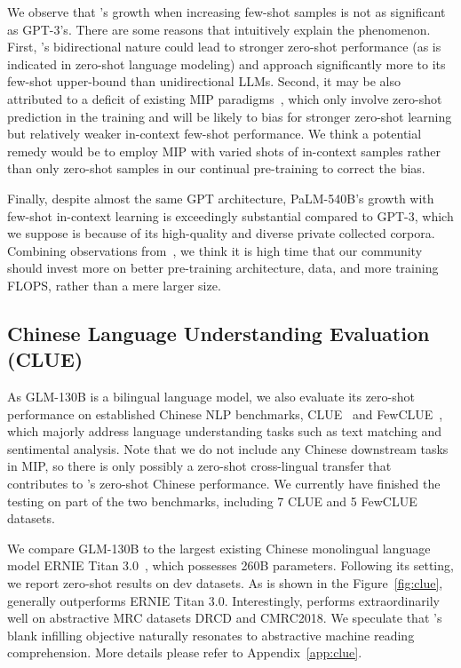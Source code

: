 {
We observe that \glm's growth when increasing few-shot samples is not as significant as GPT-3's. 
There are some reasons that intuitively explain the phenomenon.
First, \glm's bidirectional nature could lead to stronger zero-shot performance (as is indicated in zero-shot language modeling) and approach significantly more to its few-shot upper-bound than unidirectional LLMs.
Second, it may be also attributed to a deficit of existing MIP paradigms~\citep{wei2022finetuned,sanh2022multitask}, which only involve zero-shot prediction in the training and will be likely to bias \glm for stronger zero-shot learning but relatively weaker in-context few-shot performance.
We think a potential remedy would be to employ MIP with varied shots of in-context samples rather than only zero-shot samples in our continual pre-training to correct the bias.

Finally, despite almost the same GPT architecture, PaLM-540B's growth with few-shot in-context learning is exceedingly substantial compared to GPT-3, which we suppose is because of its high-quality and diverse private collected corpora. 
Combining observations from~\citep{hoffmann2022training}, we think it is high time that our community should invest more on better pre-training architecture, data, and more training FLOPS, rather than a mere larger size.

\subsection{Chinese Language Understanding Evaluation (CLUE)}

As GLM-130B is a bilingual language model, we also evaluate its zero-shot performance on established Chinese NLP benchmarks, CLUE~\citep{xu2020clue} and FewCLUE~\citep{xu2021fewclue}, which majorly address language understanding tasks such as text matching and sentimental analysis.
Note that we do not include any Chinese downstream tasks in MIP, so there is only possibly a zero-shot cross-lingual transfer that contributes to \glm's zero-shot Chinese performance. 
We currently have finished the testing on part of the two benchmarks, including 7 CLUE and 5 FewCLUE datasets.

We compare GLM-130B to the largest existing Chinese monolingual language model ERNIE Titan 3.0~\citep{wang2021ernie}, which possesses 260B parameters. 
Following its setting, we report zero-shot results on dev datasets. 
As is shown in the Figure~\ref{fig:clue}, \glm generally outperforms ERNIE Titan 3.0.
Interestingly, \glm performs extraordinarily well on abstractive MRC datasets DRCD and CMRC2018.
We speculate that \glm's blank infilling objective naturally resonates to abstractive machine reading comprehension.
More details please refer to Appendix~\ref{app:clue}.

}
